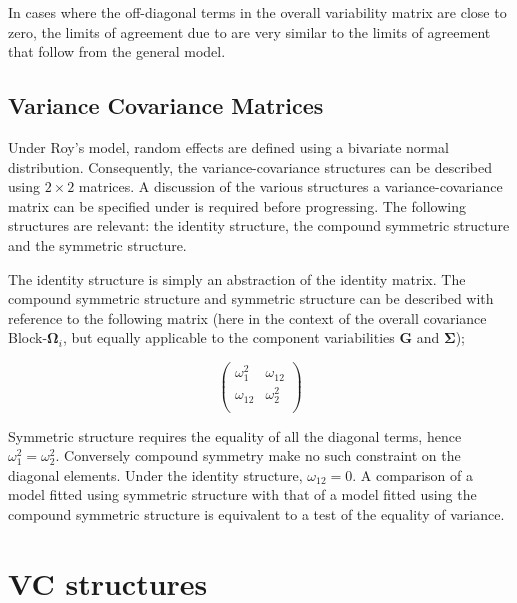 \documentclass[12pt, a4paper]{report}
\theoremstyle{plain}
\theoremstyle{definition}
\theoremstyle{remark}
\begin{document}
	In cases where the off-diagonal terms in the overall variability
	matrix are close to zero, the limits of agreement due to
	\citet{BXC2008} are very similar to the limits of agreement that
	follow from the general model.
	
	\newpage
	
	
	


	\subsection{Variance Covariance Matrices }
	
	Under Roy's model, random effects are defined using a bivariate normal distribution. Consequently, the variance-covariance structures can be described using $2 \times 2$  matrices. A discussion of the various structures a variance-covariance matrix can be specified under is required before progressing. The following structures are relevant: the identity structure, the compound symmetric structure and the symmetric structure.
	
	The identity structure is simply an abstraction of the identity matrix. The compound symmetric structure and symmetric structure can be described with reference to the following matrix (here in the context of the overall covariance Block-$\boldsymbol{\Omega}_i$, but equally applicable to the component variabilities $\boldsymbol{G}$ and $\boldsymbol{\Sigma}$);
	
	\[\left( \begin{array}{cc}
	\omega^2_1  & \omega_{12} \\
	\omega_{12} & \omega^2_2 \\
	\end{array}\right) \]
	
	Symmetric structure requires the equality of all the diagonal terms, hence $\omega^2_1 = \omega^2_2$. Conversely compound symmetry make no such constraint on the diagonal elements. Under the identity structure, $\omega_{12} = 0$.
	A comparison of a model fitted using symmetric structure with that of a model fitted using the compound symmetric structure is equivalent to a test of the equality of variance.
	
	
	
	

	\section{VC structures}
\end{document}
